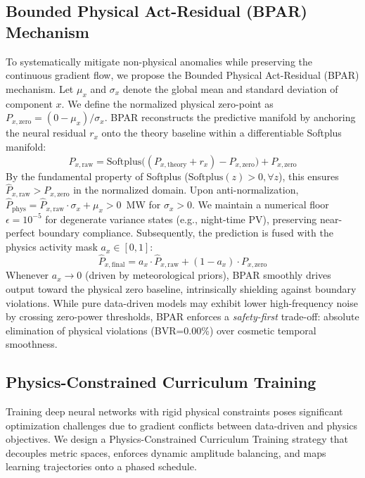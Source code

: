 \subsection{Bounded Physical Act-Residual (BPAR) Mechanism} \label{subsec:bpar}
To systematically mitigate non-physical anomalies while preserving the continuous gradient flow, we propose the Bounded Physical Act-Residual (BPAR) mechanism. Let $\mu_x$ and $\sigma_x$ denote the global mean and standard deviation of component $x$. We define the normalized physical zero-point as $P_{x,\text{zero}} = (0 - \mu_x) / \sigma_x$. BPAR reconstructs the predictive manifold by anchoring the neural residual $r_x$ onto the theory baseline within a differentiable Softplus manifold:
\begin{equation}
    \hat{P}_{x,\text{raw}} = \text{Softplus}\Big((P_{x,\text{theory}} + r_x) - P_{x,\text{zero}}\Big) + P_{x,\text{zero}}
\label{eq:bpar}
\end{equation}
By the fundamental property of Softplus ($\text{Softplus}(z) > 0, \forall z$), this ensures $\hat{P}_{x,\text{raw}} > P_{x,\text{zero}}$ in the normalized domain. Upon anti-normalization, $\hat{P}_{\text{phys}} = \hat{P}_{x,\text{raw}} \cdot \sigma_x + \mu_x > 0$~MW for $\sigma_x > 0$. We maintain a numerical floor $\epsilon=10^{-5}$ for degenerate variance states (e.g., night-time PV), preserving near-perfect boundary compliance.
Subsequently, the prediction is fused with the physics activity mask $a_x \in [0, 1]$:
\begin{equation}
    \hat{P}_{x,\text{final}} = a_x \cdot \hat{P}_{x,\text{raw}} + (1 - a_x) \cdot P_{x,\text{zero}}
\label{eq:activity_mask}
\end{equation}
Whenever $a_x \to 0$ (driven by meteorological priors), BPAR smoothly drives output toward the physical zero baseline, intrinsically shielding against boundary violations. While pure data-driven models may exhibit lower high-frequency noise by crossing zero-power thresholds, BPAR enforces a \textit{safety-first} trade-off: absolute elimination of physical violations (BVR=0.00\%) over cosmetic temporal smoothness.

\subsection{Physics-Constrained Curriculum Training}
\label{subsec:training}

Training deep neural networks with rigid physical constraints poses significant optimization challenges due to gradient conflicts between data-driven and physics objectives. We design a Physics-Constrained Curriculum Training strategy that decouples metric spaces, enforces dynamic amplitude balancing, and maps learning trajectories onto a phased schedule.

